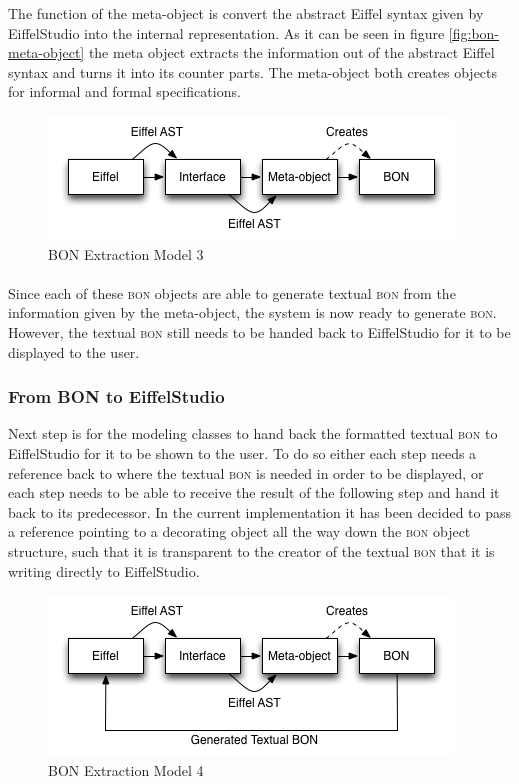 The function of the meta-object is convert the abstract Eiffel syntax given by EiffelStudio into the internal \bon{} representation. As it can be seen in figure \ref{fig:bon-meta-object} the meta object extracts the information out of the abstract Eiffel syntax and turns it into its \bon{} counter parts. The meta-object both creates objects for informal and formal specifications.

\begin{figure}[H]
\centering
\includegraphics[scale=0.8]{images/BON-extraction-model-3.png}
\caption{BON Extraction Model 3}
\label{fig:bon_extraction_3}
\end{figure}

\paragraph{}
Since each of these \textsc{bon} objects are able to generate textual \textsc{bon} from the information given by the meta-object, the system is now ready to generate \textsc{bon}. However, the textual \textsc{bon} still needs to be handed back to EiffelStudio for it to be displayed to the user.

\subsubsection{From BON to EiffelStudio}
Next step is for the modeling classes to hand back the formatted textual \textsc{bon} to EiffelStudio for it to be shown to the user. To do so either each step needs a reference back to where the textual \textsc{bon} is needed in order to be displayed, or each step needs to be able to receive the result of the following step and hand it back to its predecessor. In the current implementation it has been decided to pass a reference pointing to a decorating object all the way down the \textsc{bon} object structure, such that it is transparent to the creator of the textual \textsc{bon} that it is writing directly to EiffelStudio.

\begin{figure}[H]
\centering
\includegraphics[scale=0.8]{images/BON-extraction-model-4.png}
\caption{BON Extraction Model 4}
\label{fig:bon_extraction_4}
\end{figure}

